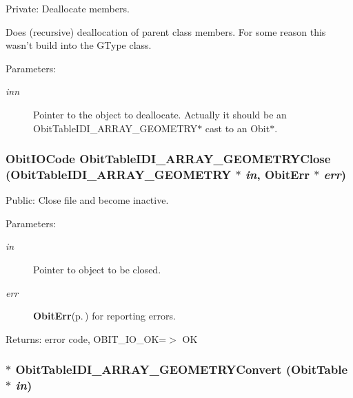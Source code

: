 Private: Deallocate members. 

Does (recursive) deallocation of parent class members. For some reason this wasn't build into the GType class. \begin{Desc}
\item[Parameters:]
\begin{description}
\item[{\em inn}]Pointer to the object to deallocate. Actually it should be an Obit\-Table\-IDI\_\-ARRAY\_\-GEOMETRY$\ast$ cast to an Obit$\ast$. \end{description}
\end{Desc}
\subsubsection{\setlength{\rightskip}{0pt plus 5cm}Obit\-IOCode Obit\-Table\-IDI\_\-ARRAY\_\-GEOMETRYClose ({\bf Obit\-Table\-IDI\_\-ARRAY\_\-GEOMETRY} $\ast$ {\em in}, {\bf Obit\-Err} $\ast$ {\em err})}\label{ObitTableIDI__ARRAY__GEOMETRY_8c_a25}


Public: Close file and become inactive. 

\begin{Desc}
\item[Parameters:]
\begin{description}
\item[{\em in}]Pointer to object to be closed. \item[{\em err}]{\bf Obit\-Err}{\rm (p.\,\pageref{structObitErr})} for reporting errors. \end{description}
\end{Desc}
\begin{Desc}
\item[Returns:]error code, OBIT\_\-IO\_\-OK=$>$ OK \end{Desc}
\subsubsection{$\ast$ Obit\-Table\-IDI\_\-ARRAY\_\-GEOMETRYConvert ({\bf Obit\-Table} $\ast$ {\em in})}\label{ObitTableIDI__ARRAY__GEOMETRY_8c_a19}


